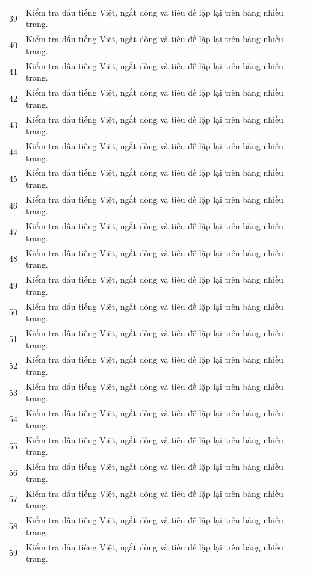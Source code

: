 \documentclass{template/ctu-report}
\begin{document}
\begin{longtable}{p{}p{}}
39 & Kiểm tra dấu tiếng Việt, ngắt dòng và tiêu đề lặp lại trên bảng nhiều trang. \\
40 & Kiểm tra dấu tiếng Việt, ngắt dòng và tiêu đề lặp lại trên bảng nhiều trang. \\
41 & Kiểm tra dấu tiếng Việt, ngắt dòng và tiêu đề lặp lại trên bảng nhiều trang. \\
42 & Kiểm tra dấu tiếng Việt, ngắt dòng và tiêu đề lặp lại trên bảng nhiều trang. \\
43 & Kiểm tra dấu tiếng Việt, ngắt dòng và tiêu đề lặp lại trên bảng nhiều trang. \\
44 & Kiểm tra dấu tiếng Việt, ngắt dòng và tiêu đề lặp lại trên bảng nhiều trang. \\
45 & Kiểm tra dấu tiếng Việt, ngắt dòng và tiêu đề lặp lại trên bảng nhiều trang. \\
46 & Kiểm tra dấu tiếng Việt, ngắt dòng và tiêu đề lặp lại trên bảng nhiều trang. \\
47 & Kiểm tra dấu tiếng Việt, ngắt dòng và tiêu đề lặp lại trên bảng nhiều trang. \\
48 & Kiểm tra dấu tiếng Việt, ngắt dòng và tiêu đề lặp lại trên bảng nhiều trang. \\
49 & Kiểm tra dấu tiếng Việt, ngắt dòng và tiêu đề lặp lại trên bảng nhiều trang. \\
50 & Kiểm tra dấu tiếng Việt, ngắt dòng và tiêu đề lặp lại trên bảng nhiều trang. \\
51 & Kiểm tra dấu tiếng Việt, ngắt dòng và tiêu đề lặp lại trên bảng nhiều trang. \\
52 & Kiểm tra dấu tiếng Việt, ngắt dòng và tiêu đề lặp lại trên bảng nhiều trang. \\
53 & Kiểm tra dấu tiếng Việt, ngắt dòng và tiêu đề lặp lại trên bảng nhiều trang. \\
54 & Kiểm tra dấu tiếng Việt, ngắt dòng và tiêu đề lặp lại trên bảng nhiều trang. \\
55 & Kiểm tra dấu tiếng Việt, ngắt dòng và tiêu đề lặp lại trên bảng nhiều trang. \\
56 & Kiểm tra dấu tiếng Việt, ngắt dòng và tiêu đề lặp lại trên bảng nhiều trang. \\
57 & Kiểm tra dấu tiếng Việt, ngắt dòng và tiêu đề lặp lại trên bảng nhiều trang. \\
58 & Kiểm tra dấu tiếng Việt, ngắt dòng và tiêu đề lặp lại trên bảng nhiều trang. \\
59 & Kiểm tra dấu tiếng Việt, ngắt dòng và tiêu đề lặp lại trên bảng nhiều trang. \\

\end{longtable}
\end{document}
